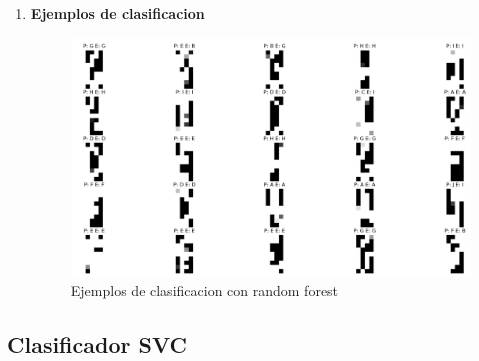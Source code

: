 \documentclass[8pt,a4paper]{article}
\begin{document}
\begin{enumerate}
\item \textbf{Ejemplos de clasificacion}

\begin{figure}[h!]
\centering
    \includegraphics[scale=0.15]{./RandomForest_9_4.png}
    \caption{Ejemplos de clasificacion con random forest}
\end{figure}
\end{enumerate}

\subsection{Clasificador SVC}
\end{document}
